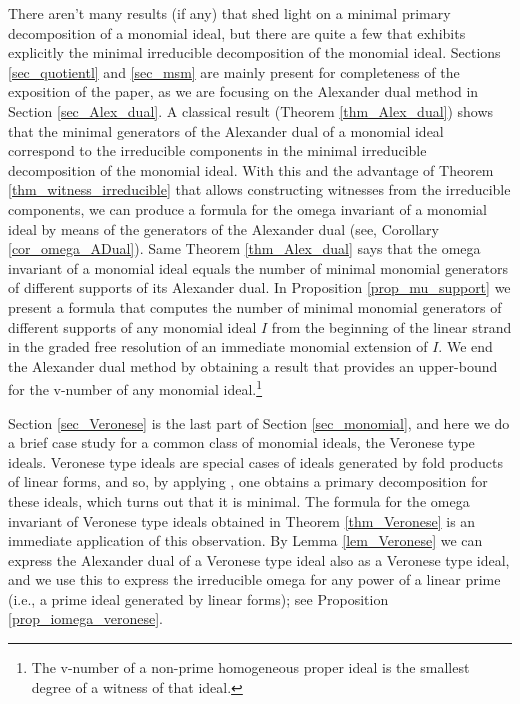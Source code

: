 \documentclass[11pt]{amsart}   %
\begin{document}
There aren't many results (if any) that shed light on a minimal primary decomposition of a monomial ideal, but there are quite a few  that exhibits explicitly the minimal irreducible decomposition of the monomial ideal. Sections \ref{sec_quotientl} and \ref{sec_msm} are mainly present for completeness of the exposition of the paper, as we are focusing on the Alexander dual method in Section \ref{sec_Alex_dual}. A classical result (Theorem \ref{thm_Alex_dual}) shows that the minimal generators of the Alexander dual of a monomial ideal correspond to the irreducible components in the minimal irreducible decomposition of the monomial ideal. With this and the advantage of Theorem \ref{thm_witness_irreducible} that allows constructing witnesses from the irreducible components, we can produce a formula for the omega invariant of a monomial ideal by  means of the generators of the Alexander dual (see, Corollary \ref{cor_omega_ADual}). Same Theorem \ref{thm_Alex_dual} says that the omega invariant of a monomial ideal equals the number of minimal monomial generators of different supports of its Alexander dual. In Proposition \ref{prop_mu_support} we present a formula that computes the number of minimal monomial generators of different supports of any monomial ideal $I$ from the beginning of the linear strand in the graded free resolution of an immediate monomial extension of $I$. We end the Alexander dual method by obtaining a result that provides an upper-bound for the v-number of any monomial ideal.\footnote{The v-number of a non-prime homogeneous proper ideal is the smallest degree of a witness of that ideal.}

Section \ref{sec_Veronese} is the last part of Section \ref{sec_monomial}, and here we do a brief case study for a common class of monomial ideals, the Veronese type ideals. Veronese type ideals are special cases of ideals generated by fold products of linear forms, and so, by applying \cite[Theorem 2.2]{BuToXi}, one obtains a primary decomposition for these ideals, which turns out that it is minimal. The formula for the omega invariant of Veronese type ideals obtained in Theorem \ref{thm_Veronese} is an immediate application of this observation. By Lemma \ref{lem_Veronese} we can express the Alexander dual of a Veronese type ideal also as a Veronese type ideal, and we use this to express the irreducible omega for any power of a linear prime (i.e., a prime ideal generated by linear forms); see Proposition \ref{prop_iomega_veronese}.

\medskip
\end{document}
